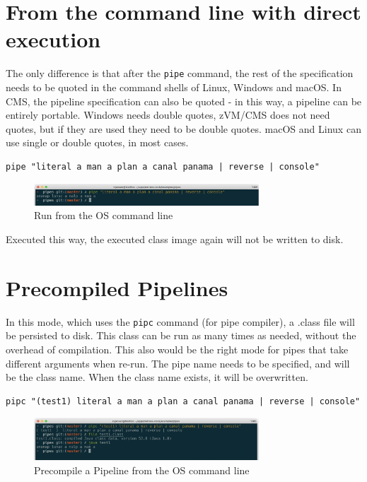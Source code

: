 \section{From the command line with direct execution}
The only difference is that after the \texttt{pipe} command,
the rest of the specification needs to be quoted in the command shells
of Linux, Windows and macOS. In CMS, the pipeline specification can
also be quoted - in this way, a pipeline can be entirely
portable. Windows needs double quotes, zVM/CMS does not need quotes,
but if they are used they need to be double quotes. macOS and Linux
can use single or double quotes, in most cases.
\begin{lstlisting}
pipe "literal a man a plan a canal panama | reverse | console"
\end{lstlisting}
\begin{figure}[h]
  \includegraphics[width=0.75\textwidth]{images/runfromshell.png}
  \caption{Run from the OS command line}
  \label{fig:runfromshell}
\end{figure}

Executed this way, the executed class image again will not be written to
disk.

\section{Precompiled Pipelines}
In this mode, which uses the \texttt{pipc} command (for pipe
compiler), a .class file will be persisted to disk. This class can be
run as many times as needed, without the overhead of compilation. This
also would be the right mode for pipes that take different arguments when re-run.
The pipe name needs to be specified, and will be the class name. When
the class name exists, it will be overwritten.
\begin{lstlisting}
pipc "(test1) literal a man a plan a canal panama | reverse | console"
\end{lstlisting}
\begin{figure}[h]
  \includegraphics[width=0.75\textwidth]{images/pipcfromshell.png}
  \caption{Precompile a Pipeline from the OS command line}
  \label{fig:pipcfromshell}
\end{figure}

